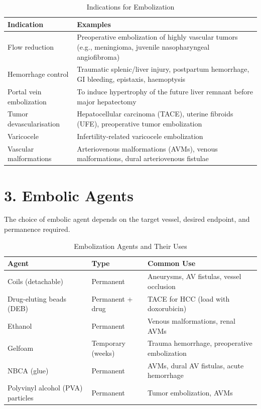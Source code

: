 \begin{table}[h]
\centering
\begin{tabular}{@{}p{}p{}@{}}
\hline
\textbf{Indication} & \textbf{Examples} \\
\hline
Flow reduction & Preoperative embolization of highly vascular tumors (e.g., meningioma, juvenile nasopharyngeal angiofibroma) \\
Hemorrhage control & Traumatic splenic/liver injury, postpartum hemorrhage, GI bleeding, epistaxis, haemoptysis \\
Portal vein embolization & To induce hypertrophy of the future liver remnant before major hepatectomy \\
Tumor devascularisation & Hepatocellular carcinoma (TACE), uterine fibroids (UFE), preoperative tumor embolization \\
Varicocele & Infertility-related varicocele embolization \\
Vascular malformations & Arteriovenous malformations (AVMs), venous malformations, dural arteriovenous fistulae \\
\hline
\end{tabular}
\caption{Indications for Embolization}
\end{table}


\section{3. Embolic Agents}

The choice of embolic agent depends on the target vessel, desired endpoint, and permanence required.

\begin{table}[h]
\centering
\begin{tabular}{@{}p{}p{}p{}@{}}
\hline
\textbf{Agent} & \textbf{Type} & \textbf{Common Use} \\
\hline
Coils (detachable) & Permanent & Aneurysms, AV fistulas, vessel occlusion \\
Drug-eluting beads (DEB) & Permanent + drug & TACE for HCC (load with doxorubicin) \\
Ethanol & Permanent & Venous malformations, renal AVMs \\
Gelfoam & Temporary (weeks) & Trauma hemorrhage, preoperative embolization \\
NBCA (glue) & Permanent & AVMs, dural AV fistulas, acute hemorrhage \\
Polyvinyl alcohol (PVA) particles & Permanent & Tumor embolization, AVMs \\
\hline
\end{tabular}
\caption{Embolization Agents and Their Uses}
\end{table}

